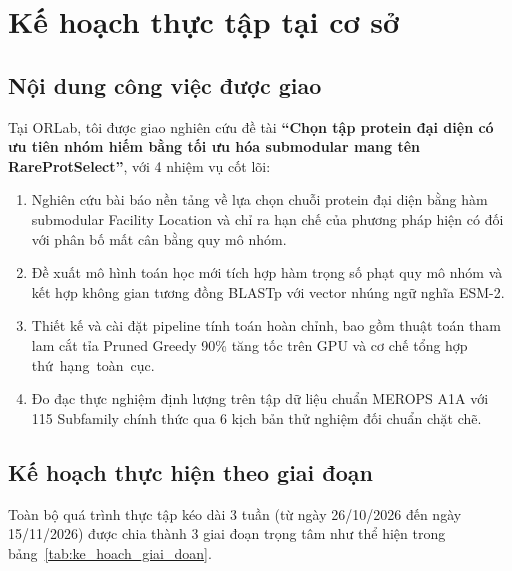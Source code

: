\clearpage
\section{Kế hoạch thực tập tại cơ sở}
\label{sec:ke_hoach_thuc_tap}

\subsection{Nội dung công việc được giao}
Tại ORLab, tôi được giao nghiên cứu đề tài \textbf{``Chọn tập protein đại diện có ưu tiên nhóm hiếm bằng tối ưu hóa submodular mang tên RareProtSelect''}, với 4 nhiệm vụ cốt lõi:
\begin{enumerate}
    \item Nghiên cứu bài báo nền tảng về lựa chọn chuỗi protein đại diện bằng hàm submodular Facility Location và chỉ ra hạn chế của phương pháp hiện có đối với phân bố mất cân bằng quy mô nhóm.
    \item Đề xuất mô hình toán học mới tích hợp hàm trọng số phạt quy mô nhóm và kết hợp không gian tương đồng BLASTp với vector nhúng ngữ nghĩa ESM-2.
    \item Thiết kế và cài đặt pipeline tính toán hoàn chỉnh, bao gồm thuật toán tham lam cắt tỉa Pruned Greedy 90\% tăng tốc trên GPU và cơ chế tổng hợp thứ~hạng~toàn~cục.
    \item Đo đạc thực nghiệm định lượng trên tập dữ liệu chuẩn MEROPS A1A với 115 Subfamily chính thức qua 6 kịch bản thử nghiệm đối chuẩn chặt chẽ.
\end{enumerate}

\subsection{Kế hoạch thực hiện theo giai đoạn}
Toàn bộ quá trình thực tập kéo dài 3 tuần (từ ngày 26/10/2026 đến ngày 15/11/2026) được chia thành 3 giai đoạn trọng tâm như thể hiện trong bảng~\ref{tab:ke_hoach_giai_doan}.

